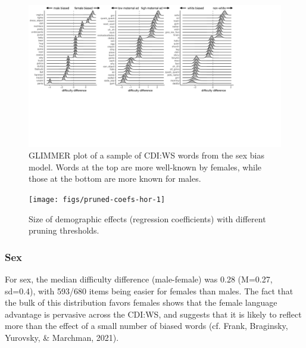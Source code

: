 \documentclass[10pt, letterpaper]{article}
\newenvironment{CodeChunk}{}{}
\begin{document}
\begin{CodeChunk}
\begin{figure}[h]

{\centering \includegraphics[width=\linewidth]{figs/smGLIMMER_combo} 

}

\caption[GLIMMER plot of a sample of CDI:WS words from the sex bias model]{GLIMMER plot of a sample of CDI:WS words from the sex bias model. Words at the top are more well-known by females, while those at the bottom are more known for males.}\label{fig:glimmer-combo}
\end{figure}
\end{CodeChunk}

\begin{CodeChunk}
\begin{figure}[h]

{\centering \texttt{[image: figs/pruned-coefs-hor-1]} 

}

\caption[Size of demographic effects (regression coefficients) with different pruning thresholds]{Size of demographic effects (regression coefficients) with different pruning thresholds.}\label{fig:pruned-coefs-hor}
\end{figure}
\end{CodeChunk}

\hypertarget{sex}{%
\subsubsection{Sex}\label{sex}}

For sex, the median difficulty difference (male-female) was 0.28
(M=0.27, sd=0.4), with 593/680 items being easier for females than
males. The fact that the bulk of this distribution favors females shows
that the female language advantage is pervasive across the CDI:WS, and
suggests that it is likely to reflect more than the effect of a small
number of biased words (cf. Frank, Braginsky, Yurovsky, \& Marchman,
2021).
\end{document}
